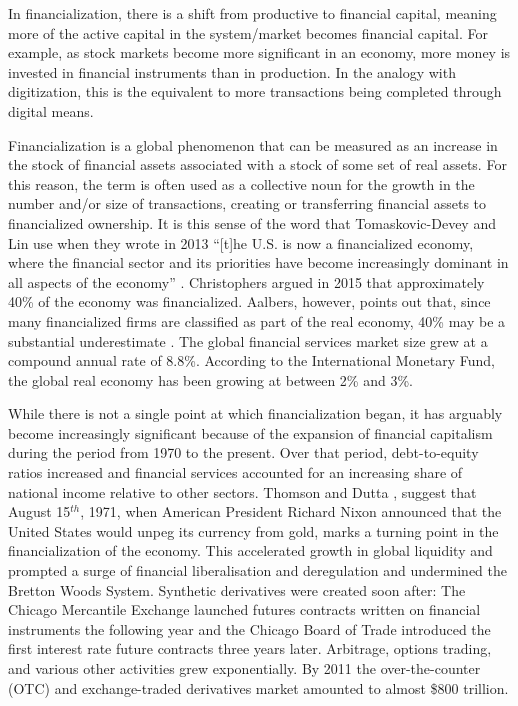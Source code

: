 In financialization, there is a shift from productive to financial capital, meaning more of the active capital in the system/market becomes financial capital. 
For example, as stock markets become more significant in an economy, more money is invested in financial instruments than in production. In the analogy with digitization, this is the equivalent to more transactions being completed through digital means. 


Financialization is a global phenomenon that can be measured as an increase in the stock of financial assets associated with a stock of some set of real assets. For this reason, the term is often used as a collective noun for the growth in the number and/or size of transactions, creating or transferring financial assets to financialized ownership.%
It is this sense of the word that Tomaskovic-Devey and Lin use when they wrote in 2013 ``[t]he U.S. is now a financialized economy, where the financial sector and its priorities have become increasingly dominant in all aspects of the economy'' \cite{tomaskovic-deveyFinancializationCausesInequality2013}. Christophers argued in 2015 that approximately 40\% of the economy was financialized. Aalbers, however, points out that, since many financialized firms are classified as part of the real economy, 40\% may be a substantial underestimate \cite{aalbersPotentialFinancialization2015}.  The global financial services market size grew at a compound annual rate of 8.8\%. According to the International Monetary Fund,  the global real economy has been growing at between 2\% and 3\%.

While there is not a single point at which financialization began, it has arguably become increasingly significant because of the expansion of financial capitalism during the period from 1970 to the present. Over that period,  debt-to-equity ratios increased and financial services accounted for an increasing share of national income relative to other sectors. Thomson and Dutta \cite{thomsonFinancialisationPrimer2018}, suggest that August 15$^{th}$, 1971, when American President Richard Nixon announced that the United States would unpeg its currency from gold, marks a turning point in the financialization of the economy. This accelerated growth in global liquidity and prompted a surge of financial liberalisation and deregulation and undermined the Bretton Woods System. Synthetic derivatives were created soon after: The Chicago Mercantile Exchange launched futures contracts written on financial instruments the following year and the Chicago Board of Trade introduced the first interest rate future contracts three years later. Arbitrage, options trading, and various other activities grew exponentially. By 2011 the over-the-counter (OTC) and exchange-traded derivatives market amounted to almost \$800 trillion. 

